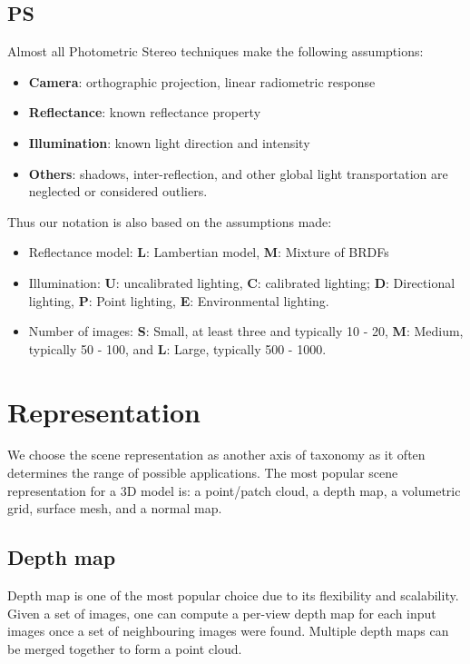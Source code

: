 \subsection{PS}
Almost all Photometric Stereo techniques make the following assumptions:
\begin{itemize}
\item \textbf{Camera}: orthographic projection, linear radiometric response
\item \textbf{Reflectance}: known reflectance property
\item \textbf{Illumination}: known light direction and intensity
\item \textbf{Others}: shadows, inter-reflection, and other global light transportation are neglected or considered outliers.
\end{itemize}

Thus our notation is also based on the assumptions made:
\begin{itemize}
\item Reflectance model: \textbf{L}: Lambertian model, \textbf{M}: Mixture of BRDFs
\item Illumination: \textbf{U}: uncalibrated lighting, \textbf{C}: calibrated lighting; \textbf{D}: Directional lighting, \textbf{P}: Point lighting, \textbf{E}: Environmental lighting.
\item Number of images: \textbf{S}: Small, at least three and typically 10 - 20, \textbf{M}: Medium, typically 50 - 100, and \textbf{L}: Large, typically 500 - 1000.
\end{itemize}

\section{Representation}
We choose the scene representation as another axis of taxonomy as it often determines the range of possible applications. The most popular scene representation for a 3D model is: a point/patch cloud, a depth map, a volumetric grid, surface mesh, and a normal map.

\subsection{Depth map}
Depth map is one of the most popular choice due to its flexibility and scalability. Given a set of images, one can compute a per-view depth map for each input images once a set of neighbouring images were found. Multiple depth maps can be merged together to form a point cloud.


